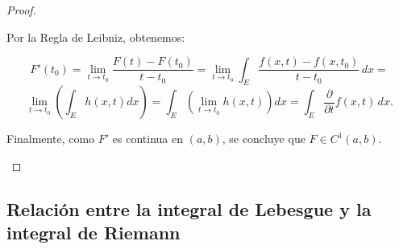 \begin{proof}
\begin{enumerate}
              Por la Regla de Leibniz, obtenemos:

              \[
                  F'(t_0) = \lim_{t \to t_0} \frac{F(t) - F(t_0)}{t - t_0} = \lim_{t \to t_0} \int_E \frac{f(x,t) - f(x,t_0)}{t - t_0} \,dx =
              \]
              \[
                  \lim_{t \to t_0} \left( \int_E h(x,t) dx \right) = \int_E \left( \lim_{t \to t_0} h(x,t) \right) dx = \int_E \frac{\partial}{\partial t} f(x,t) \,dx.
              \]

              Finalmente, como \( F' \) es continua en \( (a,b) \), se concluye que \( F \in
              C^1(a,b) \).

    \end{enumerate}
\end{proof}

\subsection{Relación entre la integral de Lebesgue y la integral de Riemann}

